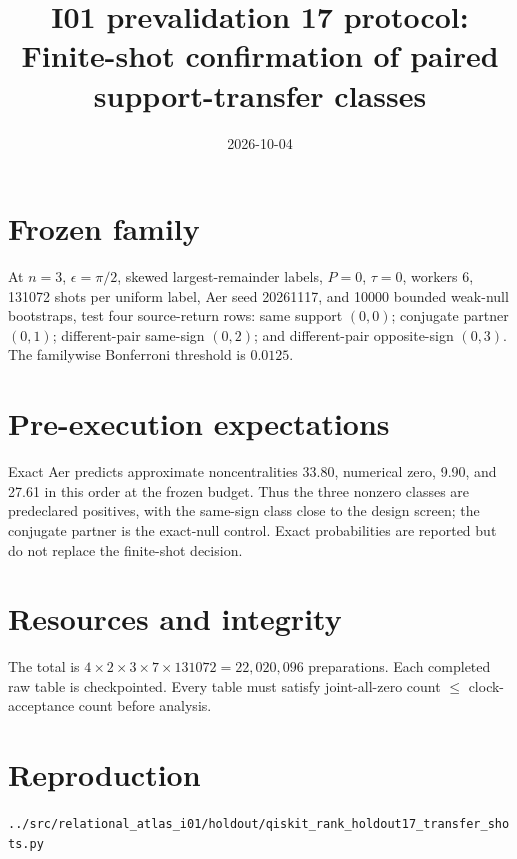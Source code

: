 \documentclass[11pt]{article}
\begin{document}
\title{I01 prevalidation 17 protocol:\\Finite-shot confirmation of paired support-transfer classes}
\date{2026-10-04}
\maketitle

\section*{Frozen family}
At $n=3$, $\epsilon=\pi/2$, skewed largest-remainder labels, $P=0$, $\tau=0$,
workers 6, 131072 shots per uniform label, Aer seed 20261117, and 10000 bounded
weak-null bootstraps, test four source-return rows: same support $(0,0)$; conjugate
partner $(0,1)$; different-pair same-sign $(0,2)$; and different-pair opposite-sign
$(0,3)$. The familywise Bonferroni threshold is $0.0125$.

\section*{Pre-execution expectations}
Exact Aer predicts approximate noncentralities 33.80, numerical zero, 9.90, and
27.61 in this order at the frozen budget. Thus the three nonzero classes are
predeclared positives, with the same-sign class close to the design screen; the
conjugate partner is the exact-null control. Exact probabilities are reported but
do not replace the finite-shot decision.

\section*{Resources and integrity}
The total is $4\times2\times3\times7\times131072=22{,}020{,}096$ preparations.
Each completed raw table is checkpointed. Every table must satisfy joint-all-zero
count $\leq$ clock-acceptance count before analysis.

\section*{Reproduction}
\texttt{../src/relational\_atlas\_i01/holdout/qiskit\_rank\_holdout17\_transfer\_shots.py}
\end{document}
